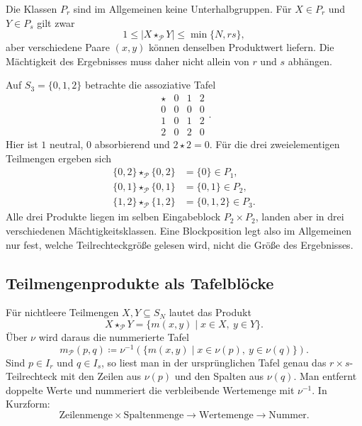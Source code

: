 \documentclass[main.tex]{subfiles}
\begin{document}
Die Klassen \(P_r\) sind im Allgemeinen keine Unterhalbgruppen.  Für
\(X\in P_r\) und \(Y\in P_s\) gilt zwar
\[
  1\leq|X\star_{\mathcal P}Y|
  \leq\min\{N,rs\},
\]
aber verschiedene Paare \((x,y)\) können denselben Produktwert liefern.  Die
Mächtigkeit des Ergebnisses muss daher nicht allein von \(r\) und \(s\)
abhängen.

\begin{example}
Auf \(S_3=\{0,1,2\}\) betrachte die assoziative Tafel
\[
\begin{array}{c|ccc}
\star&0&1&2\\\hline
0&0&0&0\\
1&0&1&2\\
2&0&2&0
\end{array}.
\]
Hier ist \(1\) neutral, \(0\) absorbierend und \(2\star2=0\).  Für die drei
zweielementigen Teilmengen ergeben sich
\[
\begin{aligned}
  \{0,2\}\star_{\mathcal P}\{0,2\}&=\{0\}\in P_1,\\
  \{0,1\}\star_{\mathcal P}\{0,1\}&=\{0,1\}\in P_2,\\
  \{1,2\}\star_{\mathcal P}\{1,2\}&=\{0,1,2\}\in P_3.
\end{aligned}
\]
Alle drei Produkte liegen im selben Eingabeblock \(P_2\times P_2\), landen
aber in drei verschiedenen Mächtigkeitsklassen.  Eine Blockposition legt
also im Allgemeinen nur fest, welche Teilrechteckgröße gelesen wird, nicht
die Größe des Ergebnisses.
\end{example}


\subsection{Teilmengenprodukte als Tafelblöcke}

Für nichtleere Teilmengen \(X,Y\subseteq S_N\) lautet das Produkt
\[
  X\star_{\mathcal P}Y
  =
  \{m(x,y)\mid x\in X,\ y\in Y\}.
\]
Über \(\nu\) wird daraus die nummerierte Tafel
\[
  \boxed{
  m_{\mathcal P}(p,q)
  \coloneqq
  \nu^{-1}\!\left(
    \{m(x,y)\mid x\in\nu(p),\ y\in\nu(q)\}
  \right).}
\]
Sind \(p\in I_r\) und \(q\in I_s\), so liest man in der ursprünglichen
Tafel genau das \(r\times s\)-Teilrechteck mit den Zeilen aus \(\nu(p)\) und
den Spalten aus \(\nu(q)\).  Man entfernt doppelte Werte und nummeriert die
verbleibende Wertemenge mit \(\nu^{-1}\).  In Kurzform:
\[
  \boxed{
  \text{Zeilenmenge}\times\text{Spaltenmenge}
  \longrightarrow
  \text{Wertemenge}
  \longrightarrow
  \text{Nummer}.}
\]
\end{document}
